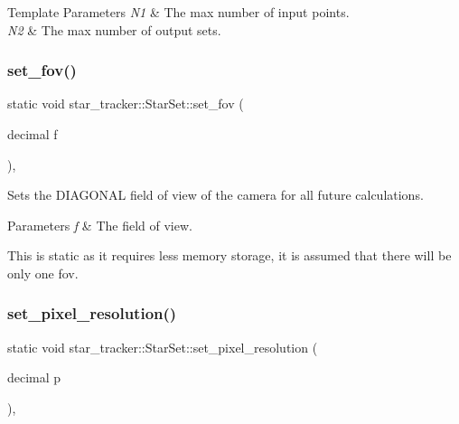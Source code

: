 \begin{DoxyTemplParams}{Template Parameters}
{\em N1} & The max number of input points. \\
\hline
{\em N2} & The max number of output sets. \\
\hline
\end{DoxyTemplParams}
\mbox{\label{classstar__tracker_1_1StarSet_a4ac44bbf443182649f4607ca8375099f}} 
\subsubsection{\texorpdfstring{set\+\_\+fov()}{set\_fov()}}
{\footnotesize\ttfamily static void star\+\_\+tracker\+::\+Star\+Set\+::set\+\_\+fov (\begin{DoxyParamCaption}\item[{decimal}]{f }\end{DoxyParamCaption})\hspace{0.3cm}{\ttfamily [inline]}, {\ttfamily [static]}}



Sets the D\+I\+A\+G\+O\+N\+AL field of view of the camera for all future calculations. 


\begin{DoxyParams}{Parameters}
{\em f} & The field of view.\\
\hline
\end{DoxyParams}
This is static as it requires less memory storage, it is assumed that there will be only one fov. \mbox{\label{classstar__tracker_1_1StarSet_a773579d8b4868f48a3bdbd23a7f3f55b}} 
\subsubsection{\texorpdfstring{set\+\_\+pixel\+\_\+resolution()}{set\_pixel\_resolution()}}
{\footnotesize\ttfamily static void star\+\_\+tracker\+::\+Star\+Set\+::set\+\_\+pixel\+\_\+resolution (\begin{DoxyParamCaption}\item[{decimal}]{p }\end{DoxyParamCaption})\hspace{0.3cm}{\ttfamily [inline]}, {\ttfamily [static]}}



